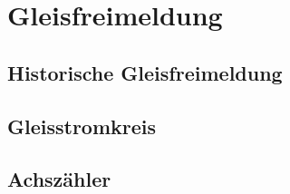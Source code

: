 \section{Gleisfreimeldung}\label{text:Grundlagen:Gleisfreimeldung}

\subsection{Historische Gleisfreimeldung}\label{text:Grundlagen:Gleisfreimeldung:Historische-Gleisfreimeldung}

\subsection{Gleisstromkreis}\label{text:Grundlagen:Gleisfreimeldung:Gleisstromkreis}

\subsection{Achszähler}\label{text:Grundlagen:Gleisfreimeldung:Achszähler}
